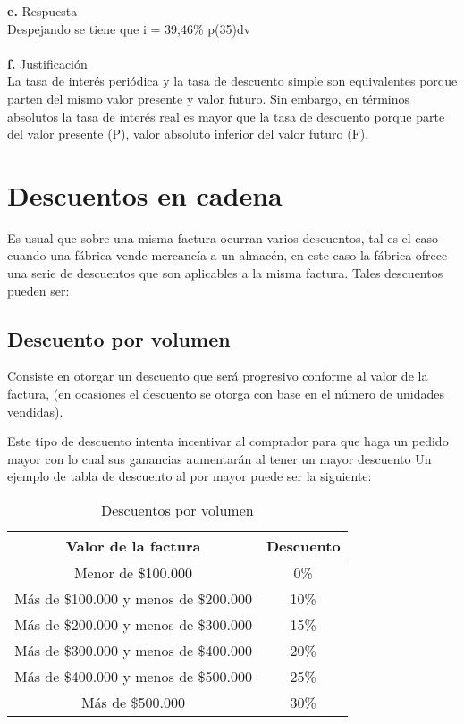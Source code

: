 \textbf{e.} Respuesta
\\
Despejando se tiene que i = 39,46\% p(35)dv
\\\\
\textbf{f.} Justificación
\\
La tasa de interés periódica y la tasa de descuento simple son equivalentes porque parten del mismo valor presente y valor futuro. Sin embargo, en términos absolutos la tasa de interés real es mayor que la tasa de descuento porque parte del valor presente (P), valor absoluto inferior del valor futuro (F).

\section{Descuentos en cadena}
Es usual que sobre una misma factura ocurran varios descuentos, tal es el caso cuando una fábrica vende mercancía a un almacén, en este caso la fábrica ofrece una serie de descuentos que son aplicables a la misma factura. Tales descuentos pueden ser:


\subsection{Descuento por volumen}
Consiste en otorgar un descuento que será progresivo conforme al valor de la factura, (en ocasiones el descuento se otorga con base en el número de unidades vendidas).

Este tipo de descuento intenta incentivar al comprador para que haga un pedido mayor con lo cual sus ganancias aumentarán al tener un mayor descuento Un ejemplo de tabla de descuento al por mayor puede ser la siguiente:

\begin{table}[H]
\fontsize{11}{9}\selectfont
\centering
\label{Descuento por volumen}
\begin{tabular}{|l|l|c|l|}
\hline
\multicolumn{2}{|c|}{Valor de la factura}                 & \multicolumn{2}{c|}{Descuento} \\ \hline
\multicolumn{2}{|c|}{Menor de \$100.000}                  & \multicolumn{2}{c|}{0\%}       \\ 
\multicolumn{2}{|c|}{Más de \$100.000 y menos de \$200.000} & \multicolumn{2}{c|}{10\%}      \\ 
\multicolumn{2}{|c|}{Más de \$200.000 y menos de \$300.000} & \multicolumn{2}{c|}{15\%}      \\
\multicolumn{2}{|c|}{Más de \$300.000 y menos de \$400.000} & \multicolumn{2}{c|}{20\%}      \\ 
\multicolumn{2}{|c|}{Más de \$400.000 y menos de \$500.000} & \multicolumn{2}{c|}{25\%}      \\
\multicolumn{2}{|c|}{Más de \$500.000}                    & \multicolumn{2}{c|}{30\%}      \\ \hline
\end{tabular}
\caption{Descuentos por volumen}
\end{table}


